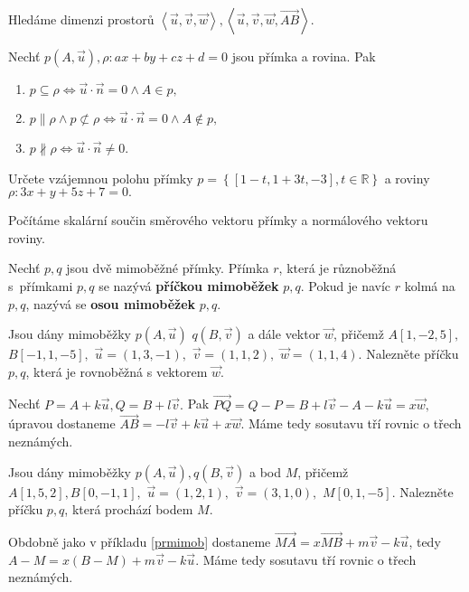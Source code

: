 \begin{reseni}
Hledáme dimenzi prostorů $\left < \vec u, \vec v, \vec w \right >, \left < \vec u, \vec v, \vec w,  \overrightarrow{AB} \right > .$
\end{reseni}

\begin{veta}
    Nechť $p(A,\vec u), \rho: ax+by+cz+d=0$ jsou přímka a rovina. Pak
    \begin{enumerate}[$i.$]
    \item $p\subseteq \rho \iff \vec u \cdot \vec n = 0\land A\in p,$
   	\item $p \parallel \rho \land p \not\subset \rho \iff \vec u\cdot \vec n = 0\land A\notin p,$
   	\item $p \nparallel \rho \iff \vec u\cdot \vec n\ne 0$.
    \end{enumerate}
\end{veta}

\begin{priklad}
Určete vzájemnou polohu přímky $p=\left \{ [1-t,1+3t,-3],t \in \mathbb R \right \} $ a
roviny $\rho:3x+y+5z+7=0.$
\end{priklad}

\begin{reseni}
Počítáme skalární součin směrového vektoru přímky a normálového vektoru roviny.
\end{reseni}

\begin{definition}
Nechť $p,q$ jsou dvě mimoběžné přímky. Přímka $r$, která je různoběžná s~přímkami
$p,q$ se nazývá \textbf{příčkou mimoběžek} $p,q$. Pokud je navíc $r$ kolmá na $p,q$,
nazývá se \textbf{osou mimoběžek} $p,q$.
\end{definition}

\begin{priklad}\label{prmimob}
Jsou dány mimoběžky  $p(A,\vec u)$ $q(B,\vec v)$ a dále vektor $\vec w$, přičemž
$A[1,-2,5],$ $B[-1,1,-5],$ $\vec u = (1,3,-1),$ $\vec v=(1,1,2),$ $\vec w = (1,1,4).$
Nalezněte příčku $p,q$, která je rovnoběžná s vektorem $\vec w.$
\end{priklad}

\begin{reseni}
Nechť $P=A+k\vec u, Q=B+l\vec v.$ Pak $\overrightarrow{PQ}=Q-P=B+l\vec v - A - k\vec u=x\vec w,$
úpravou dostaneme $\overrightarrow{AB}=-l\vec v+k\vec u+x\vec w.$ Máme tedy
sosutavu tří rovnic o třech neznámých.
\end{reseni}

\begin{priklad}
Jsou dány mimoběžky $p(A,\vec u), q(B,\vec v)$ a bod $M$, přičemž
$A[1,5,2],B[0,-1,1],$ $\vec u=(1,2,1),$ $\vec v = (3,1,0),$ $M[0,1,-5].$  Nalezněte
příčku $p,q$, která prochází bodem $M$.
\end{priklad}

\begin{reseni}
Obdobně jako v příkladu \ref{prmimob} dostaneme $\overrightarrow{MA}=x\overrightarrow{MB}+m\vec v-k\vec u$,
tedy $A-M=x(B-M)+m\vec v - k\vec u$. Máme tedy
sosutavu tří rovnic o třech neznámých.
\end{reseni}
